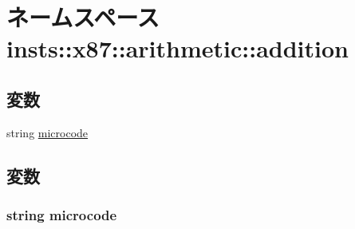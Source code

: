 \hypertarget{namespaceinsts_1_1x87_1_1arithmetic_1_1addition}{
\section{ネームスペース insts::x87::arithmetic::addition}
\label{namespaceinsts_1_1x87_1_1arithmetic_1_1addition}
}
\subsection*{変数}
\begin{DoxyCompactItemize}
\item 
string \hyperlink{namespaceinsts_1_1x87_1_1arithmetic_1_1addition_a770f11a173e99389a8802f0107ed8f52}{microcode}
\end{DoxyCompactItemize}


\subsection{変数}
\hypertarget{namespaceinsts_1_1x87_1_1arithmetic_1_1addition_a770f11a173e99389a8802f0107ed8f52}{
\subsubsection[{microcode}]{\setlength{\rightskip}{0pt plus 5cm}string {\bf microcode}}}
\label{namespaceinsts_1_1x87_1_1arithmetic_1_1addition_a770f11a173e99389a8802f0107ed8f52}
